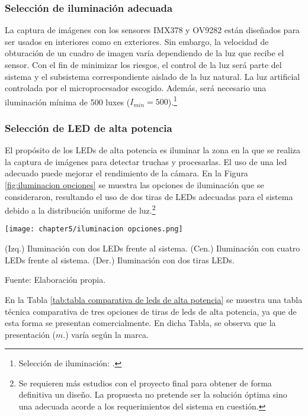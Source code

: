 \subsubsection{Selección de iluminación adecuada} 

La captura de imágenes con los sensores IMX378 y OV9282 están diseñados para ser usados en interiores como en exteriores. Sin embargo, la velocidad de obturación de un cuadro de imagen varía dependiendo de la luz que recibe el sensor. Con el fin de minimizar los riesgos, el control de la luz será parte del sistema y el subsistema correspondiente aislado de la luz natural. La luz artificial controlada por el microprocesador escogido. Además, será necesario una iluminación mínima de 500 luxes ($I_{min}=500$).\footnote{Selección de iluminación: \cite{Ryer1997}.}

\subsubsection{Selección de LED de alta potencia}

El propósito de los LEDs de alta potencia es iluminar la zona en la que se realiza la captura de imágenes para detectar truchas y procesarlas. El uso de una led adecuado puede mejorar el rendimiento de la cámara. En la Figura \ref{fig:iluminacion opciones} se muestra las opciones de iluminación que se consideraron, resultando el uso de dos tiras de LEDs adecuadas para el sistema debido a la distribución uniforme de luz.\footnote{Se requieren más estudios con el proyecto final para obtener de forma definitiva un diseño. La propuesta no pretende ser la solución óptima sino una adecuada acorde a los requerimientos del sistema en cuestión.}

\begin{myfigure}[H]
	\footnotesize\centering
	\texttt{[image: chapter5/iluminacion opciones.png]}
	\caption[Opciones de posicionamiento de iluminación.]{(Izq.) Iluminación con dos LEDs frente al sistema. (Cen.) Iluminación con cuatro LEDs frente al sistema. (Der.) Iluminación con dos tiras LEDs.}
	\begin{myflushcenter}
		Fuente: Elaboración propia.
	\end{myflushcenter}
	\label{fig:iluminacion opciones}
\end{myfigure}

En la Tabla \ref{tab:tabla comparativa de leds de alta potencia} se muestra una tabla técnica comparativa de tres opciones de tiras de leds de alta potencia, ya que de esta forma se presentan comercialmente. En dicha Tabla, se observa que la presentación ($m.$) varía según la marca.

